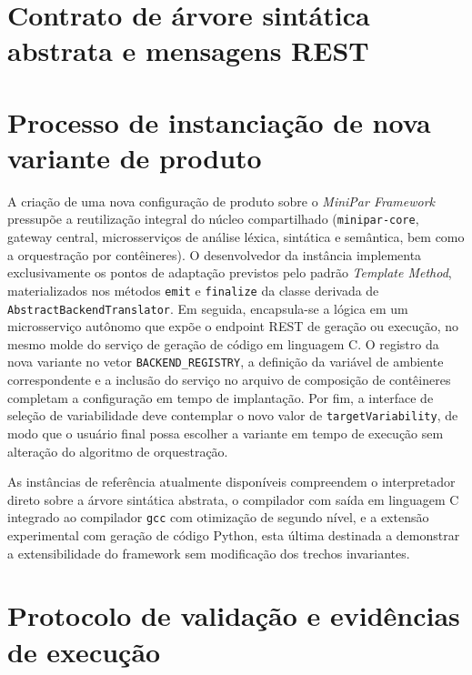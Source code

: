 
\section{Contrato de árvore sintática abstrata e mensagens REST}
\label{app:ast-contract}



\section{Processo de instanciação de nova variante de produto}
\label{app:creating-app}

A criação de uma nova configuração de produto sobre o \emph{MiniPar Framework} pressupõe a reutilização integral do núcleo compartilhado (\texttt{minipar-core}, gateway central, microsserviços de análise léxica, sintática e semântica, bem como a orquestração por contêineres). O desenvolvedor da instância implementa exclusivamente os pontos de adaptação previstos pelo padrão \emph{Template Method}, materializados nos métodos \texttt{emit} e \texttt{finalize} da classe derivada de \texttt{AbstractBackendTranslator}. Em seguida, encapsula-se a lógica em um microsserviço autônomo que expõe o endpoint REST de geração ou execução, no mesmo molde do serviço de geração de código em linguagem C. O registro da nova variante no vetor \texttt{BACKEND\_REGISTRY}, a definição da variável de ambiente correspondente e a inclusão do serviço no arquivo de composição de contêineres completam a configuração em tempo de implantação. Por fim, a interface de seleção de variabilidade deve contemplar o novo valor de \texttt{targetVariability}, de modo que o usuário final possa escolher a variante em tempo de execução sem alteração do algoritmo de orquestração.

As instâncias de referência atualmente disponíveis compreendem o interpretador direto sobre a árvore sintática abstrata, o compilador com saída em linguagem C integrado ao compilador \texttt{gcc} com otimização de segundo nível, e a extensão experimental com geração de código Python, esta última destinada a demonstrar a extensibilidade do framework sem modificação dos trechos invariantes.

\section{Protocolo de validação e evidências de execução}
\label{app:e2e}

